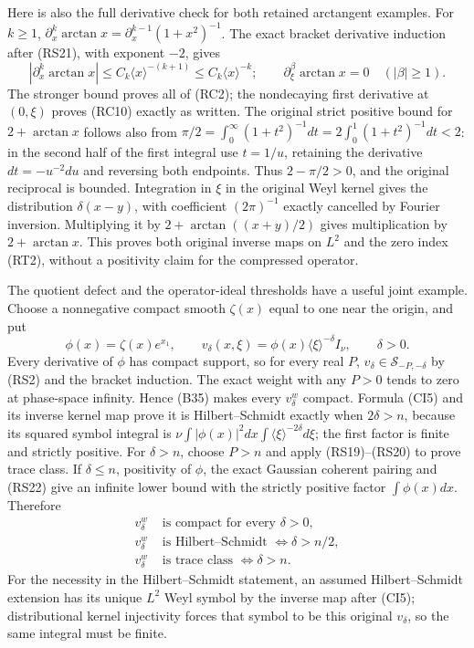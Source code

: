 \documentclass[
  11pt,
]{article}
\begin{document}
Here is also the full derivative check for both retained arctangent
examples. For \(k\geq1\),
\(\partial_x^k\arctan x=\partial_x^{k-1}(1+x^2)^{-1}\). The exact
bracket derivative induction after (RS21), with exponent \(-2\), gives
\[
 |\partial_x^k\arctan x|
     \leq C_k\langle x\rangle^{-(k+1)}
     \leq C_k\langle x\rangle^{-k};
 \qquad \partial_\xi^\beta\arctan x=0\quad(|\beta|\geq1).
 \tag{RS32}
\] The stronger bound proves all of (RC2); the nondecaying first
derivative at \((0,\xi)\) proves (RC10) exactly as written. The original
strict positive bound for \(2+\arctan x\) follows also from
\(\pi/2=\int_0^\infty(1+t^2)^{-1}dt
=2\int_0^1(1+t^2)^{-1}dt<2\): in the second half of the first integral
use \(t=1/u\), retaining the derivative \(dt=-u^{-2}du\) and reversing
both endpoints. Thus \(2-\pi/2>0\), and the original reciprocal is
bounded. Integration in \(\xi\) in the original Weyl kernel gives the
distribution \(\delta(x-y)\), with coefficient \((2\pi)^{-1}\) exactly
cancelled by Fourier inversion. Multiplying it by \(2+\arctan((x+y)/2)\)
gives multiplication by \(2+\arctan x\). This proves both original
inverse maps on \(L^2\) and the zero index (RT2), without a positivity
claim for the compressed operator.

The quotient defect and the operator-ideal thresholds have a useful
joint example. Choose a nonnegative compact smooth \(\zeta(x)\) equal to
one near the origin, and put \[
 \phi(x)=\zeta(x)e^{x_1},\qquad
 v_\delta(x,\xi)=\phi(x)\langle\xi\rangle^{-\delta}I_\nu,
                    \qquad\delta>0 .
 \tag{RS33}
\] Every derivative of \(\phi\) has compact support, so for every real
\(P\), \(v_\delta\in\mathcal S_{-P,-\delta}\) by (RS2) and the bracket
induction. The exact weight with any \(P>0\) tends to zero at
phase-space infinity. Hence (B35) makes every \(v_\delta^w\) compact.
Formula (CI5) and its inverse kernel map prove it is Hilbert--Schmidt
exactly when \(2\delta>n\), because its squared symbol integral is
\(\nu\int|\phi(x)|^2dx\int\langle\xi\rangle^{-2\delta}d\xi\); the first
factor is finite and strictly positive. For \(\delta>n\), choose \(P>n\)
and apply (RS19)--(RS20) to prove trace class. If \(\delta\leq n\),
positivity of \(\phi\), the exact Gaussian coherent pairing and (RS22)
give an infinite lower bound with the strictly positive factor
\(\int\phi(x)dx\). Therefore \[
 \begin{split}
 v_\delta^w&\text{ is compact for every }\delta>0,\\
 v_\delta^w&\text{ is Hilbert--Schmidt }\Longleftrightarrow\delta>n/2,\\
 v_\delta^w&\text{ is trace class }\Longleftrightarrow\delta>n .
 \end{split}
 \tag{RS34}
\] For the necessity in the Hilbert--Schmidt statement, an assumed
Hilbert--Schmidt extension has its unique \(L^2\) Weyl symbol by the
inverse map after (CI5); distributional kernel injectivity forces that
symbol to be this original \(v_\delta\), so the same integral must be
finite.
\end{document}
